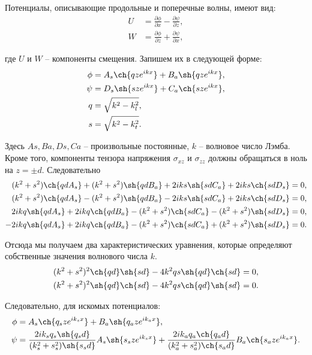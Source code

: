 Потенциалы, описывающие продольные и поперечные волны, имеют вид:
\begin{align}
U &= \frac{\partial \phi}{\partial x} - \frac{\partial \psi}{\partial z}, \nonumber\\
W &= \frac{\partial \phi}{\partial z} + \frac{\partial \psi}{\partial x},
\end{align}

где $U$ и $W$ -- компоненты смещения. Запишем их в следующей форме:
\begin{align}
\phi &= A_s \ch{qze^{ikx}} + B_a \sh{qze^{ikx}}, \nonumber\\
\psi &= D_s \sh{sze^{ikx}} + C_a \ch{sze^{ikx}}, \nonumber\\
q &= \sqrt{k^2 - k_l^2}, \nonumber\\
s &= \sqrt{k^2 - k_t^2}.
\end{align}

Здесь $As, Ba, Ds, Ca$ -- произвольные постоянные, $k$ -- волновое число Лэмба. Кроме того, компоненты тензора напряжения $\sigma_{xz}$ и $\sigma_{zz}$ должны обращаться в ноль на $z = \pm d$. Следовательно
\begin{align}
(k^2+s^2)\ch{qdA_s} + (k^2+s^2)\sh{qdB_a} + 2iks\sh{sdC_a} + 2iks\ch{sdD_s} = 0, \nonumber\\
(k^2+s^2)\ch{qdA_s} - (k^2+s^2)\sh{qdB_a} - 2iks\sh{sdC_a} + 2iks\ch{sdD_s} = 0, \nonumber\\
2ikq\sh{qdA_s} + 2ikq\ch{qdB_a} - (k^2+s^2)\ch{sdC_a} - (k^2+s^2)\sh{sdD_s} = 0, \nonumber\\
-2ikq\sh{qdA_s} + 2ikq\ch{qdB_a} - (k^2+s^2)\ch{sdC_a} + (k^2+s^2)\sh{sdD_s} = 0.
\end{align}

Отсюда мы получаем два характеристических уравнения, которые определяют собственные значения волнового числа $k$.
\begin{align}
(k^2+s^2)^2\ch{qd}\sh{sd} - 4k^2qs\sh{qd}\ch{sd} = 0, \nonumber\\
(k^2+s^2)^2\sh{qd}\ch{sd} - 4k^2qs\ch{qd}\sh{sd} = 0.
\end{align}

Следовательно, для искомых потенциалов:
\begin{align}
\phi &= A_s\ch{q_{s}ze^{ik_{s}x}} + B_a\sh{q_{a}ze^{ik_{a}x}}, \nonumber\\
\psi &= \frac{ 2ik_{s}q_{s}\sh{q_{s}d} }{ (k_s^2+s_s^2)\sh{s_{s}d} } A_s\sh{s_{s}ze^{ik_{s}x}} + \frac{ 2ik_{a}q_{a}\ch{q_{a}d} }{ (k_a^2+s_a^2)\ch{s_{a}d} } B_a\ch{s_{a}ze^{ik_{a}x}}.
\end{align}

